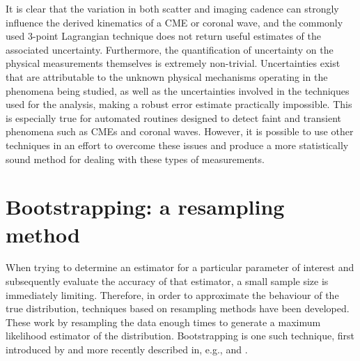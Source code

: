 \documentclass[structabstract]{aa}
\begin{document}
It is clear that the variation in both scatter and imaging cadence can strongly influence the derived kinematics of a CME or coronal wave, and the commonly used 3-point Lagrangian technique does not return useful estimates of the associated uncertainty. Furthermore, the quantification of uncertainty on the physical measurements themselves is extremely non-trivial. Uncertainties exist that are attributable to the unknown physical mechanisms operating in the phenomena being studied, as well as the uncertainties involved in the techniques used for the analysis, making a robust error estimate practically impossible. This is especially true for automated routines designed to detect faint and transient phenomena such as CMEs and coronal waves. However, it is possible to use other techniques in an effort to overcome these issues and produce a more statistically sound method for dealing with these types of measurements.


\section{Bootstrapping: a resampling method}
\label{sect:bootstrapping}

When trying to determine an estimator for a particular parameter of interest and subsequently evaluate the accuracy of that estimator, a small sample size is immediately limiting. Therefore, in order to approximate the behaviour of the true distribution, techniques based on resampling methods have been developed. These work by resampling the data enough times to generate a maximum likelihood estimator of the distribution. Bootstrapping is one such technique, first introduced by \citet{Efron:1979p1831} and more recently described in, e.g., \citet{1994.book.Efron} and \citet{Chernick1999}. 
\end{document}
